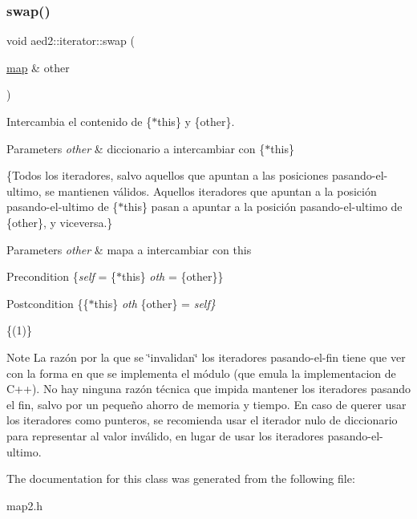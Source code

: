 \subsubsection{\texorpdfstring{swap()}{swap()}}
{\footnotesize\ttfamily void aed2\+::iterator\+::swap (\begin{DoxyParamCaption}\item[{\hyperlink{classaed2_1_1map}{map} \&}]{other }\end{DoxyParamCaption})\hspace{0.3cm}{\ttfamily [inline]}}



Intercambia el contenido de \{$\ast$this\} y \{other\}. 


\begin{DoxyParams}{Parameters}
{\em other} & diccionario a intercambiar con \{$\ast$this\}\\
\hline
\end{DoxyParams}
\{Todos los iteradores, salvo aquellos que apuntan a las posiciones pasando-\/el-\/ultimo, se mantienen válidos. Aquellos iteradores que apuntan a la posición pasando-\/el-\/ultimo de \{$\ast$this\} pasan a apuntar a la posición pasando-\/el-\/ultimo de \{other\}, y viceversa.\}


\begin{DoxyParams}{Parameters}
{\em other} & mapa a intercambiar con this\\
\hline
\end{DoxyParams}
\begin{DoxyPrecond}{Precondition}
\{{\itshape self} = \{$\ast$this\}  {\itshape oth} = \{other\}\} 
\end{DoxyPrecond}
\begin{DoxyPostcond}{Postcondition}
\{\{$\ast$this\}  {\itshape oth}  \{other\} = {\itshape self\}} 
\end{DoxyPostcond}
\{(1)\}

\begin{DoxyNote}{Note}
La razón por la que se \char`\"{}invalidan\char`\"{} los iteradores pasando-\/el-\/fin tiene que ver con la forma en que se implementa el módulo (que emula la implementacion de C++). No hay ninguna razón técnica que impida mantener los iteradores pasando el fin, salvo por un pequeño ahorro de memoria y tiempo. En caso de querer usar los iteradores como punteros, se recomienda usar el iterador nulo de diccionario para representar al valor inválido, en lugar de usar los iteradores pasando-\/el-\/ultimo. 
\end{DoxyNote}


The documentation for this class was generated from the following file\+:\begin{DoxyCompactItemize}
\item 
map2.\+h\end{DoxyCompactItemize}
